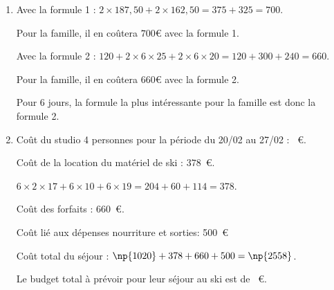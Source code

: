 
\medskip

\begin{enumerate}
\item Avec la formule 1 : $2\times 187,50 + 2 \times 162,50 = 375 + 325 = 700$.

Pour la famille, il en coûtera $700$\euro{} avec la formule 1.

Avec la formule 2 : $120 + 2 \times 6 \times 25 + 2 \times 6 \times 20 = 120 + 300 + 240 = 660$.

Pour la famille, il en coûtera $660$\euro{} avec la formule 2.

Pour 6 jours, la formule la plus intéressante pour la famille est donc la formule 2.
\item Coût du studio 4 personnes pour la période du 20/02 au 27/02 : ~\euro.

Coût de la location du matériel de ski : $378$~\euro.

$6 \times 2 \times 17 + 6 \times 10 + 6 \times 19 = 204 + 60 + 114 = 378$.

Coût des forfaits : $660$~\euro.

Coût lié aux dépenses nourriture et sorties: 500~\euro

Coût total du séjour : $\np{1020} + 378 + 660 + 500 = \np{2558}$.

Le budget total à prévoir pour leur séjour au ski est de ~\euro.
\end{enumerate}		
